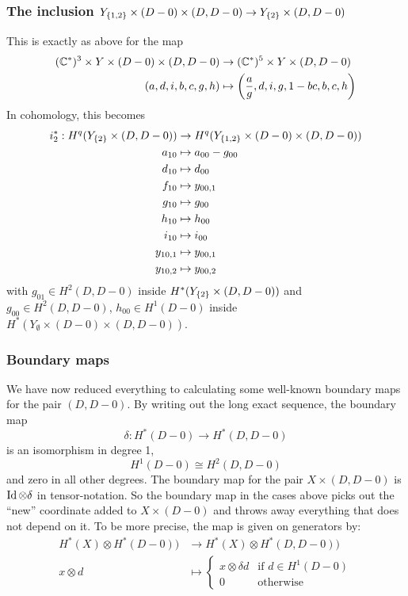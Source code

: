 \subsubsection{The inclusion $Y_{\left\{ 1,2 \right\}}\times (D-0)
\times (D,D-0) \to Y_{\left\{ 2 \right\}}\times (D,D-0)$}
This is exactly as above for the map
\begin{align*}
  (\mathbb{C}^*)^3 \times Y \times (D-0)\times (D,D-0) &\to (\mathbb{C}^*)^5 \times
  Y\times (D,D-0) \\ 
  (a,d,i,b,c,g,h) &\mapsto
  \left(\frac{a}{g},d,i,g,1-bc,b,c,h\right)
\end{align*}
In cohomology, this becomes
\begin{align*}
  i_2^* : H^q(Y_{\left\{ 2 \right\}}\times (D,D-0)) &\to H^q(Y_{\left\{ 1,2 \right\}}\times
  (D-0) \times (D,D-0)) \\
  a_{10} &\mapsto a_{00} - g_{00} \\
  d_{10} &\mapsto d_{00} \\
  f_{10} &\mapsto y_{00,1}\\
  g_{10} &\mapsto g_{00} \\
  h_{10} &\mapsto h_{00} \\
  i_{10} & \mapsto i_{00} \\
  y_{10,1} &\mapsto y_{00,1} \\
  y_{10,2} &\mapsto y_{00,2}
\end{align*}
with $g_{01}\in H^2(D,D-0)$ inside $H^*(Y_{\left\{ 2 \right\}}\times (D,D-0))$ and
$g_{00}\in H^2(D,D-0)$, $h_{00}\in H^1(D-0)$ inside
$H^*(Y_{\emptyset}\times(D-0)\times(D,D-0))$.

\subsubsection{Boundary maps}
\label{disk}
We have now reduced everything to calculating some well-known boundary
maps for the pair $(D,D-0)$. By writing out the long exact sequence,
the boundary map
\[ \delta : H^*(D-0) \to H^*(D,D-0) \]
is an isomorphism in degree 1,
\[ H^1(D-0) \cong H^2(D,D-0) \]
and zero in all other degrees. The boundary map for the pair $X\times
(D,D-0)$ is $\operatorname{Id}\otimes \delta$ in tensor-notation. So the boundary
map in the cases above picks out the ``new'' coordinate added to
$X\times (D-0)$ and throws away everything that does not depend on
it. To be more precise, the map is given on generators by:
\begin{align*}
  H^*(X)\otimes H^*(D-0)) &\to H^*(X)\otimes H^*(D,D-0)) \\
  x\otimes d &\mapsto
  \begin{cases}
    x \otimes \delta d & \text{if } d\in H^1(D-0) \\
    0 & \text{otherwise}
  \end{cases}
\end{align*}

